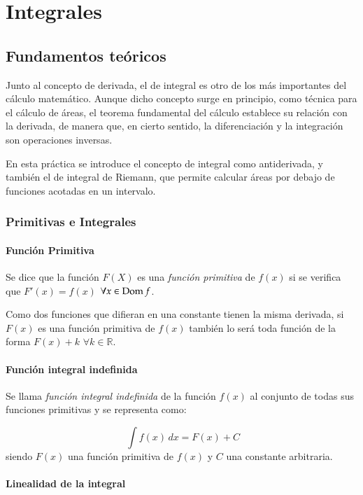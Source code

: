 \chapter{Integrales}

\section{Fundamentos teóricos}
Junto al concepto de derivada, el de integral es otro de los más importantes
del cálculo matemático. Aunque dicho concepto surge en principio, como técnica
para el cálculo de áreas, el teorema fundamental del cálculo establece su
relación con la derivada, de manera que, en cierto sentido, la diferenciación
y la integración son operaciones inversas.

En esta práctica se introduce el concepto de integral como antiderivada, y
también el de integral de Riemann, que permite calcular áreas por debajo de
funciones acotadas en un intervalo.

\subsection{Primitivas e Integrales}
\subsubsection*{Función Primitiva}

Se dice que la función $F(X)$ es una \emph{función primitiva} de
$f(x)$ si se verifica que $F'(x)=f(x)$ $\forall x \in \operatorname{Dom} f$.

Como dos funciones que difieran en una constante tienen la misma
derivada, si $F(x)$ es una función primitiva de $f(x)$ también lo será toda función de la forma $F(x)+k$ $\forall k \in \mathbb{R}$.\\


\subsubsection*{Función integral indefinida}

Se llama \emph{función integral indefinida} de la función $f(x)$ al
conjunto de todas sus funciones primitivas y se representa como:

\[
\ \int{f(x)}\,dx=F(x)+C
\]
siendo $F(x)$ una función primitiva de $f(x)$ y $C$ una constante arbitraria.\\


\subsubsection*{Linealidad de la integral}

